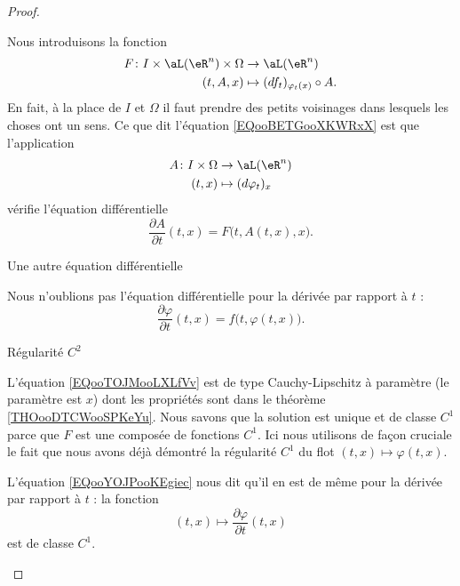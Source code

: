 \begin{proof}
\begin{subproof}
    Nous introduisons la fonction 
    \begin{equation}
        \begin{aligned}
            F\colon I\times \aL(\eR^n)\times \Omega&\to \aL(\eR^n)  \\
            (t,A,x)&\mapsto (df_t)_{\varphi_t(x)}\circ A. 
        \end{aligned}
    \end{equation}
    En fait, à la place de \( I\) et \( \Omega\) il faut prendre des petits voisinages dans lesquels les choses ont un sens. Ce que dit l'équation \ref{EQooBETGooXKWRxX} est que l'application
    \begin{equation}
        \begin{aligned}
            A\colon I\times \Omega&\to \aL(\eR^n) \\
            (t,x)&\mapsto (d\varphi_t)_x 
        \end{aligned}
    \end{equation}
    vérifie l'équation différentielle
    \begin{equation}        \label{EQooTOJMooLXLfVv}
        \frac{ \partial A }{ \partial t }(t,x)=F\big( t,A(t,x),x \big).
    \end{equation}

    \item[Une autre équation différentielle]

        Nous n'oublions pas l'équation différentielle pour la dérivée par rapport à \( t\) :
        \begin{equation}        \label{EQooYOJPooKEgiec}
            \frac{ \partial \varphi }{ \partial t }(t,x)=f\big( t,\varphi(t,x) \big).
        \end{equation}

    \item[Régularité \( C^2\)]

        L'équation \eqref{EQooTOJMooLXLfVv} est de type Cauchy-Lipschitz à paramètre (le paramètre est \( x\)) dont les propriétés sont dans le théorème \ref{THOooDTCWooSPKeYu}. Nous savons que la solution est unique et de classe \( C^1\) parce que \( F\) est une composée de fonctions \( C^1\). Ici nous utilisons de façon cruciale le fait que nous avons déjà démontré la régularité \( C^1\) du flot \( (t,x)\mapsto \varphi(t,x)\).

        L'équation \eqref{EQooYOJPooKEgiec} nous dit qu'il en est de même pour la dérivée par rapport à \( t\) : la fonction
        \begin{equation}
            (t,x)\mapsto \frac{ \partial \varphi }{ \partial t }(t,x)
        \end{equation}
        est de classe \( C^1\).


\end{subproof}
\end{proof}
